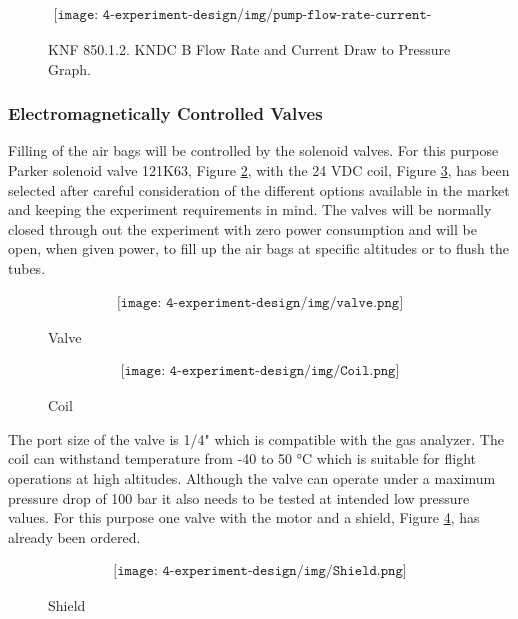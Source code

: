 \begin{figure}[H]
    \begin{align*}
        \texttt{[image: 4-experiment-design/img/pump-flow-rate-current-graph.png]}
    \end{align*}
    \caption{KNF 850.1.2. KNDC B Flow Rate and Current Draw to Pressure Graph.}\label{fig:pumpflowcur}
\end{figure}


\subsubsection{Electromagnetically Controlled Valves}
Filling of the air bags will be controlled by the solenoid valves. For this purpose Parker solenoid valve 121K63, Figure \ref{fig:valve},  with the 24 VDC coil, Figure \ref{fig:coil}, has been selected after careful consideration of the different options available in the market and keeping the experiment requirements in mind. The valves will be normally closed through out the experiment with zero power consumption and will be open, when given power, to fill up the air bags at specific altitudes or to flush the tubes.

\begin{figure}[H]
    \begin{align*}
        \texttt{[image: 4-experiment-design/img/valve.png]}
    \end{align*}
    \caption{Valve}\label{fig:valve}
\end{figure}

\begin{figure}[H]
    \begin{align*}
        \texttt{[image: 4-experiment-design/img/Coil.png]}
    \end{align*}
    \caption{Coil}\label{fig:coil}
\end{figure}


The port size of the valve is 1/4" which is compatible with the gas analyzer. The coil can withstand temperature from -40 to 50 °C which is suitable for flight operations at high altitudes. Although the valve can operate under a maximum pressure drop of 100 bar it also needs to be tested at intended low pressure values. For this purpose one valve with the motor and a shield, Figure \ref{fig:shield}, has already been ordered.  


\begin{figure}[H]
    \begin{align*}
        \texttt{[image: 4-experiment-design/img/Shield.png]}
    \end{align*}
    \caption{Shield}\label{fig:shield}
\end{figure}

